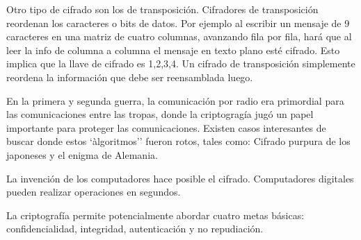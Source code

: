 Otro tipo de cifrado son los de transposición.
Cifradores de transposición reordenan los caracteres o bits de datos. Por ejemplo al escribir un mensaje de 9 caracteres en una matriz de cuatro columnas, avanzando fila por fila, hará que al leer la info de columna a columna el mensaje en texto plano esté cifrado. Esto implica que la llave de cifrado es {1,2,3,4}. Un cifrado de transposición simplemente reordena la información que debe ser reensamblada luego. 



En la primera y segunda guerra, la comunicación por radio era primordial para las comunicaciones entre las tropas, donde la criptogragía jugó un papel importante para proteger las comunicaciones. Existen casos interesantes de buscar donde estos `àlgoritmos'' fueron rotos, tales como: Cifrado purpura de los japoneses y el enigma de Alemania.  

La invención de los computadores hace posible el cifrado. Computadores digitales pueden realizar operaciones en segundos. 



La criptografía permite potencialmente abordar cuatro metas básicas: confidencialidad, integridad, autenticación y no repudiación. 



